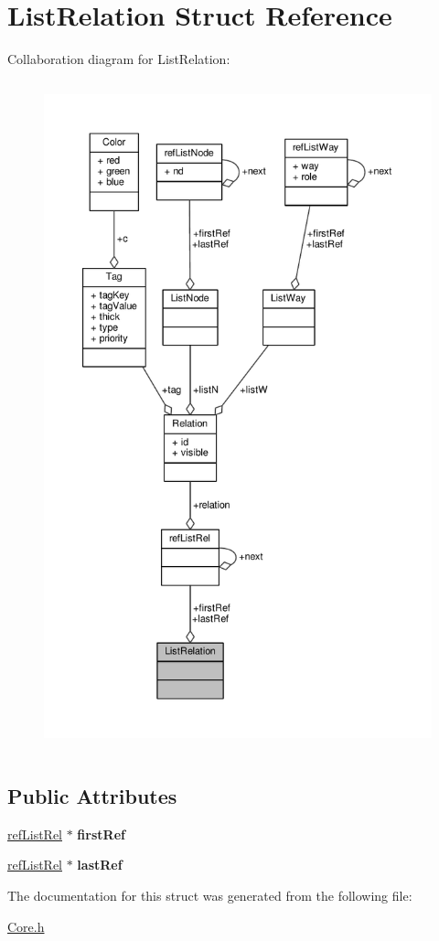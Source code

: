 \hypertarget{structListRelation}{\section{List\-Relation Struct Reference}
\label{structListRelation}
}


Collaboration diagram for List\-Relation\-:
\nopagebreak
\begin{figure}[H]
\begin{center}
\leavevmode
\includegraphics[height=550pt]{structListRelation__coll__graph}
\end{center}
\end{figure}
\subsection*{Public Attributes}
\begin{DoxyCompactItemize}
\item 
\hypertarget{structListRelation_a9de99495f108f7572e94513904e89478}{\hyperlink{structrefListRel}{ref\-List\-Rel} $\ast$ {\bfseries first\-Ref}}\label{structListRelation_a9de99495f108f7572e94513904e89478}

\item 
\hypertarget{structListRelation_a817271b56fb219729619f60c982dc4ec}{\hyperlink{structrefListRel}{ref\-List\-Rel} $\ast$ {\bfseries last\-Ref}}\label{structListRelation_a817271b56fb219729619f60c982dc4ec}

\end{DoxyCompactItemize}


The documentation for this struct was generated from the following file\-:\begin{DoxyCompactItemize}
\item 
\hyperlink{Core_8h}{Core.\-h}\end{DoxyCompactItemize}
